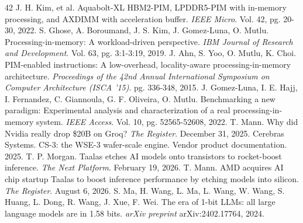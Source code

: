 \documentclass[12pt,onecolumn]{article}
\begin{document}
\begin{thebibliography}{42}
 J. H. Kim, et al. Aquabolt-XL HBM2-PIM, LPDDR5-PIM with in-memory processing, and AXDIMM with acceleration buffer. \textit{IEEE Micro}. Vol. 42, pg. 20-30, 2022.
 S. Ghose, A. Boroumand, J. S. Kim, J. Gomez-Luna, O. Mutlu. Processing-in-memory: A workload-driven perspective. \textit{IBM Journal of Research and Development}. Vol. 63, pg. 3:1-3:19, 2019.
 J. Ahn, S. Yoo, O. Mutlu, K. Choi. PIM-enabled instructions: A low-overhead, locality-aware processing-in-memory architecture. \textit{Proceedings of the 42nd Annual International Symposium on Computer Architecture (ISCA '15)}. pg. 336-348, 2015.
 J. Gomez-Luna, I. E. Hajj, I. Fernandez, C. Giannoula, G. F. Oliveira, O. Mutlu. Benchmarking a new paradigm: Experimental analysis and characterization of a real processing-in-memory system. \textit{IEEE Access}. Vol. 10, pg. 52565-52608, 2022.
 T. Mann. Why did Nvidia really drop \$20B on Groq? \textit{The Register}. December 31, 2025.
 Cerebras Systems. CS-3: the WSE-3 wafer-scale engine. Vendor product documentation. 2025.
 T. P. Morgan. Taalas etches AI models onto transistors to rocket-boost inference. \textit{The Next Platform}. February 19, 2026.
 T. Mann. AMD acquires AI chip startup Taalas to boost inference performance by etching models into silicon. \textit{The Register}. August 6, 2026.
 S. Ma, H. Wang, L. Ma, L. Wang, W. Wang, S. Huang, L. Dong, R. Wang, J. Xue, F. Wei. The era of 1-bit LLMs: all large language models are in 1.58 bits. \textit{arXiv preprint} arXiv:2402.17764, 2024.
\end{thebibliography}
\end{document}
